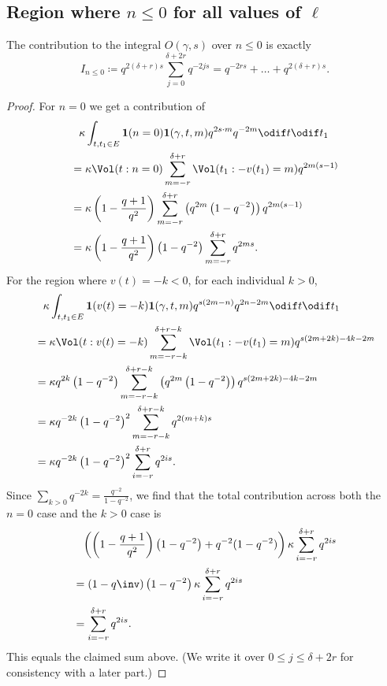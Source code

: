 \subsection{Region where $n \leq 0$ for all values of $\ell$}
\begin{proposition}
  The contribution to the integral $O(\gamma,s)$ over $n \leq 0$ is exactly
  \[ I_{n \le 0} \coloneqq q^{2(\delta+r)s} \sum_{j=0}^{\delta+2r} q^{-2js}
    = q^{-2rs} + \dots + q^{2(\delta+r)s}. \]
\end{proposition}
\begin{proof}
  For $n = 0$ we get a contribution of
  \begin{align*}
    &\phantom= \kappa \int_{t, t_1 \in E} \mathbf{1}(n=0) \mathbf{1}(\gamma,t,m)
      q^{2s \cdot m} q^{-2m} \odif t \odif t_1 \\
    &= \kappa \Vol(t: n =0) \sum_{m=-r}^{\delta+r} \Vol(t_1: -v(t_1)=m) q^{2m(s-1)} \\
    &= \kappa \left( 1 - \frac{q+1}{q^2} \right) \sum_{m=-r}^{\delta+r}
    \left( q^{2m} \left( 1-q^{-2} \right) \right) q^{2m(s-1)} \\
    &= \kappa \left( 1 - \frac{q+1}{q^2} \right) \left( 1-q^{-2} \right)
    \sum_{m=-r}^{\delta+r} q^{2ms}.
  \end{align*}
  For the region where $v(t) = -k < 0$, for each individual $k > 0$,
  \begin{align*}
    &\phantom= \kappa \int_{t, t_1 \in E} \mathbf{1}(v(t)=-k) \mathbf{1}(\gamma,t,m)
      q^{s(2m-n)} q^{2n-2m} \odif t \odif t_1 \\
    &= \kappa \Vol(t: v(t)=-k) \sum_{m=-r-k}^{\delta+r-k}
      \Vol(t_1: -v(t_1)=m) q^{s(2m+2k)-4k-2m} \\
    &= \kappa q^{2k} \left( 1 - q^{-2} \right) \sum_{m=-r-k}^{\delta+r-k}
      \left( q^{2m} \left( 1-q^{-2} \right) \right) q^{s(2m+2k)-4k-2m} \\
    &= \kappa q^{-2k} \left( 1 - q^{-2} \right)^2
      \sum_{m=-r-k}^{\delta+r-k} q^{2(m+k)s} \\
    &= \kappa q^{-2k} \left( 1 - q^{-2} \right)^2 \sum_{i=-r}^{\delta+r} q^{2is}.
  \end{align*}
  Since $\sum_{k > 0} q^{-2k} = \frac{q^{-2}}{1-q^{-2}}$,
  we find that the total contribution across both
  the $n=0$ case and the $k > 0$ case is
  \begin{align*}
    &\phantom= \left( \left( 1 - \frac{q+1}{q^2} \right) \left( 1-q^{-2} \right)
      + q^{-2}(1-q^{-2})  \right) \kappa \sum_{i=-r}^{\delta+r} q^{2is} \\
    &= \left( 1-q\inv \right) \left(1-q^{-2} \right)
      \kappa \sum_{i=-r}^{\delta+r} q^{2is} \\
    &= \sum_{i=-r}^{\delta+r} q^{2is}.
  \end{align*}
  This equals the claimed sum above.
  (We write it over $0 \le j \le \delta+2r$ for consistency with a later part.)
\end{proof}


